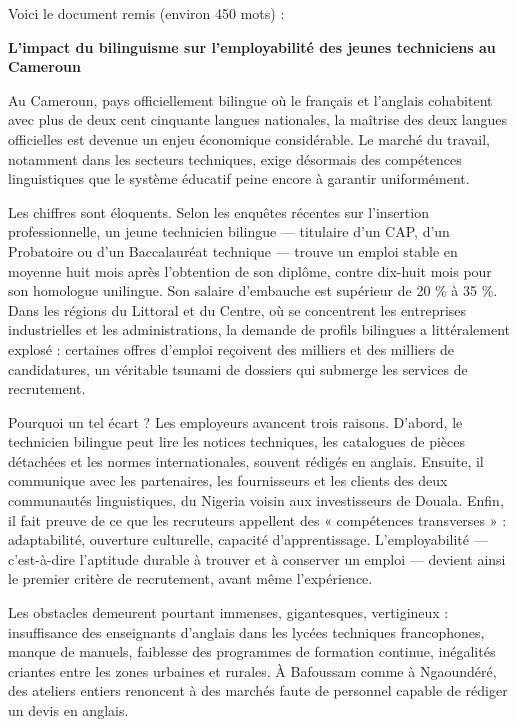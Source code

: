 \documentclass[11pt]{article}
\begin{document}
Voici le document remis (environ 450 mots) :

\begin{exemplebox}
\textbf{L'impact du bilinguisme sur l'employabilité des jeunes techniciens au Cameroun}

Au Cameroun, pays officiellement bilingue où le français et l'anglais cohabitent avec plus de deux cent cinquante langues nationales, la maîtrise des deux langues officielles est devenue un enjeu économique considérable. Le marché du travail, notamment dans les secteurs techniques, exige désormais des compétences linguistiques que le système éducatif peine encore à garantir uniformément.

Les chiffres sont éloquents. Selon les enquêtes récentes sur l'insertion professionnelle, un jeune technicien bilingue — titulaire d'un CAP, d'un Probatoire ou d'un Baccalauréat technique — trouve un emploi stable en moyenne huit mois après l'obtention de son diplôme, contre dix-huit mois pour son homologue unilingue. Son salaire d'embauche est supérieur de 20 \% à 35 \%. Dans les régions du Littoral et du Centre, où se concentrent les entreprises industrielles et les administrations, la demande de profils bilingues a littéralement explosé : certaines offres d'emploi reçoivent des milliers et des milliers de candidatures, un véritable tsunami de dossiers qui submerge les services de recrutement.

Pourquoi un tel écart ? Les employeurs avancent trois raisons. D'abord, le technicien bilingue peut lire les notices techniques, les catalogues de pièces détachées et les normes internationales, souvent rédigés en anglais. Ensuite, il communique avec les partenaires, les fournisseurs et les clients des deux communautés linguistiques, du Nigeria voisin aux investisseurs de Douala. Enfin, il fait preuve de ce que les recruteurs appellent des « compétences transverses » : adaptabilité, ouverture culturelle, capacité d'apprentissage. L'employabilité — c'est-à-dire l'aptitude durable à trouver et à conserver un emploi — devient ainsi le premier critère de recrutement, avant même l'expérience.

Les obstacles demeurent pourtant immenses, gigantesques, vertigineux : insuffisance des enseignants d'anglais dans les lycées techniques francophones, manque de manuels, faiblesse des programmes de formation continue, inégalités criantes entre les zones urbaines et rurales. À Bafoussam comme à Ngaoundéré, des ateliers entiers renoncent à des marchés faute de personnel capable de rédiger un devis en anglais.


\end{exemplebox}
\end{document}

